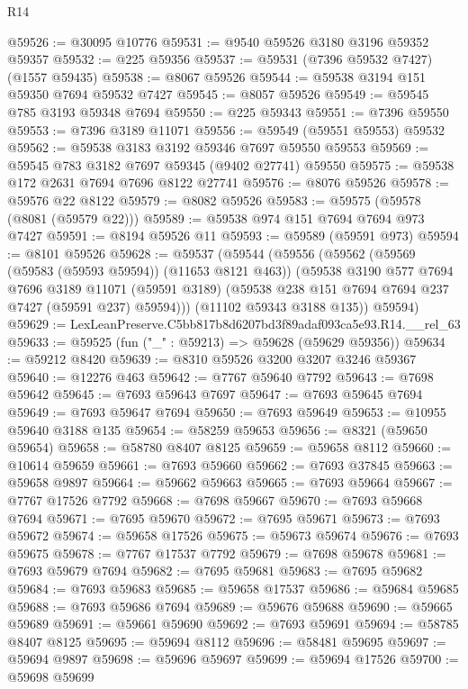 \begin{lexlean}{R14}
\begin{coremodule}
@59526 := @30095 @10776
@59531 := @9540 @59526 @3180 @3196 @59352 @59357
@59532 := @225 @59356
@59537 := @59531 (@7396 @59532 @7427) (@1557 @59435)
@59538 := @8067 @59526
@59544 := @59538 @3194 @151 @59350 @7694 @59532 @7427
@59545 := @8057 @59526
@59549 := @59545 @785 @3193 @59348 @7694
@59550 := @225 @59343
@59551 := @7396 @59550
@59553 := @7396 @3189 @11071
@59556 := @59549 (@59551 @59553) @59532
@59562 := @59538 @3183 @3192 @59346 @7697 @59550 @59553
@59569 := @59545 @783 @3182 @7697 @59345 (@9402 @27741) @59550
@59575 := @59538 @172 @2631 @7694 @7696 @8122 @27741
@59576 := @8076 @59526
@59578 := @59576 @22 @8122
@59579 := @8082 @59526
@59583 := @59575 (@59578 (@8081 (@59579 @22)))
@59589 := @59538 @974 @151 @7694 @7694 @973 @7427
@59591 := @8194 @59526 @11
@59593 := @59589 (@59591 @973)
@59594 := @8101 @59526
@59628 := @59537
    (@59544
      (@59556
        (@59562
          (@59569 (@59583 (@59593 @59594)) (@11653 @8121 @463))
          (@59538
            @3190
            @577
            @7694
            @7696
            @3189
            @11071
            (@59591 @3189)
            (@59538 @238 @151 @7694 @7694 @237 @7427 (@59591 @237) @59594)))
        (@11102 @59343 @3188 @135))
      @59594)
@59629 := LexLeanPreserve.C5bb817b8d6207bd3f89adaf093ca5e93.R14.__rel_63
@59633 := @59525 (fun ("_" : @59213) => @59628 (@59629 @59356))
@59634 := @59212 @8420
@59639 := @8310 @59526 @3200 @3207 @3246 @59367
@59640 := @12276 @463
@59642 := @7767 @59640 @7792
@59643 := @7698 @59642
@59645 := @7693 @59643 @7697
@59647 := @7693 @59645 @7694
@59649 := @7693 @59647 @7694
@59650 := @7693 @59649
@59653 := @10955 @59640 @3188 @135
@59654 := @58259 @59653
@59656 := @8321 (@59650 @59654)
@59658 := @58780 @8407 @8125
@59659 := @59658 @8112
@59660 := @10614 @59659
@59661 := @7693 @59660
@59662 := @7693 @37845
@59663 := @59658 @9897
@59664 := @59662 @59663
@59665 := @7693 @59664
@59667 := @7767 @17526 @7792
@59668 := @7698 @59667
@59670 := @7693 @59668 @7694
@59671 := @7695 @59670
@59672 := @7695 @59671
@59673 := @7693 @59672
@59674 := @59658 @17526
@59675 := @59673 @59674
@59676 := @7693 @59675
@59678 := @7767 @17537 @7792
@59679 := @7698 @59678
@59681 := @7693 @59679 @7694
@59682 := @7695 @59681
@59683 := @7695 @59682
@59684 := @7693 @59683
@59685 := @59658 @17537
@59686 := @59684 @59685
@59688 := @7693 @59686 @7694
@59689 := @59676 @59688
@59690 := @59665 @59689
@59691 := @59661 @59690
@59692 := @7693 @59691
@59694 := @58785 @8407 @8125
@59695 := @59694 @8112
@59696 := @58481 @59695
@59697 := @59694 @9897
@59698 := @59696 @59697
@59699 := @59694 @17526
@59700 := @59698 @59699

\end{coremodule}
\end{lexlean}

